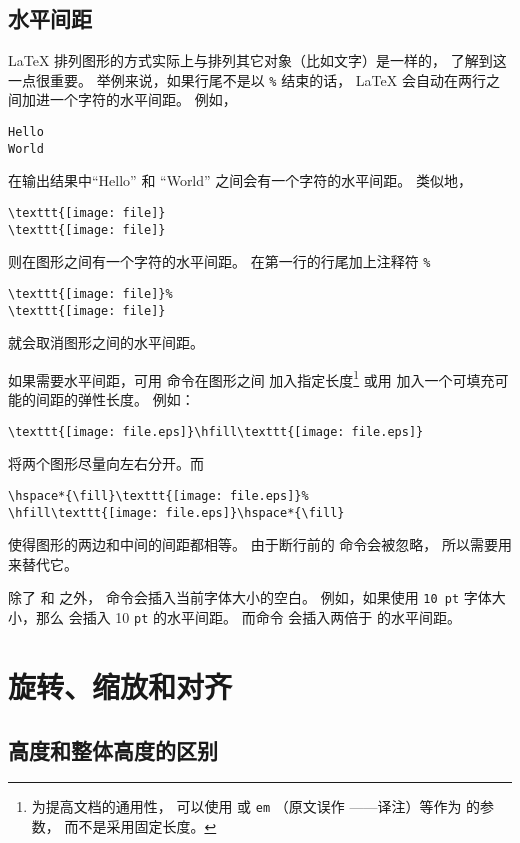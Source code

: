 \subsection{水平间距}\label{ssec:hspace}
\LaTeX{} 排列图形的方式实际上与排列其它对象（比如文字）是一样的，
了解到这一点很重要。
举例来说，如果行尾不是以 \texttt{\%} 结束的话，
\LaTeX{} 会自动在两行之间加进一个字符的水平间距。
例如，
\begin{lstlisting}
Hello
World
\end{lstlisting}
在输出结果中``Hello'' 和 ``World'' 之间会有一个字符的水平间距。
类似地，
\begin{lstlisting}
\texttt{[image: file]}
\texttt{[image: file]}
\end{lstlisting}
则在图形之间有一个字符的水平间距。
在第一行的行尾加上注释符 \texttt{\%}
\begin{lstlisting}
\texttt{[image: file]}%
\texttt{[image: file]}
\end{lstlisting}
就会取消图形之间的水平间距。

如果需要水平间距，可用  命令在图形之间
加入指定长度\footnote{
    为提高文档的通用性，
	可以使用  或 \texttt{em} （原文误作 ——译注）等作为  的参数，
	而不是采用固定长度。}
或用  加入一个可填充可能的间距的弹性长度。
例如：
\begin{lstlisting}
\texttt{[image: file.eps]}\hfill\texttt{[image: file.eps]}
\end{lstlisting}
将两个图形尽量向左右分开。而
\begin{lstlisting}
\hspace*{\fill}\texttt{[image: file.eps]}%
\hfill\texttt{[image: file.eps]}\hspace*{\fill}
\end{lstlisting}
使得图形的两边和中间的间距都相等。
由于断行前的  命令会被忽略，
所以需要用  来替代它。

除了  和  之外，
 命令会插入当前字体大小的空白。
例如，如果使用 \texttt{10 pt} 字体大小，那么  会插入 10 \texttt{pt} 的水平间距。
而命令  会插入两倍于  的水平间距。


\section{旋转、缩放和对齐}\label{sec:rotate-scale-align}

\subsection{高度和整体高度的区别}\label{ssec:diffheight}

